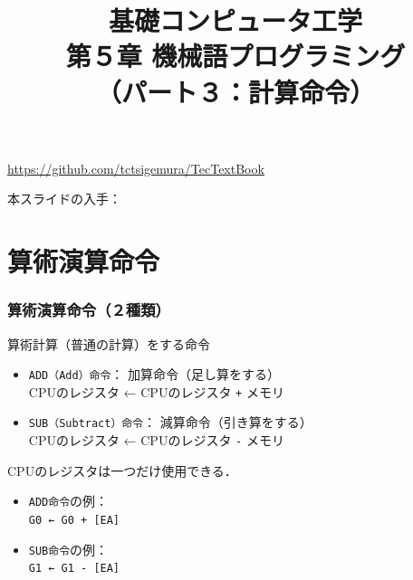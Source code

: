 \documentclass[handout]{beamer}        %
\begin{document}
\title{基礎コンピュータ工学\\第５章 機械語プログラミング\\
       （パート３：計算命令）}
\date{}

\begin{frame}
  \titlepage
  \centerline{\url{https://github.com/tctsigemura/TecTextBook}}
  \vfill
  \centerline{本スライドの入手：
    }
\end{frame}


\section{算術演算命令}
\begin{frame}
  \frametitle{算術演算命令（２種類）}
  算術計算（普通の計算）をする命令
  \begin{itemize}
  \item \texttt{ADD（Add）命令}： 加算命令（足し算をする） \\
    CPUのレジスタ ← CPUのレジスタ \texttt{+} メモリ
  \item \texttt{SUB（Subtract）命令}： 減算命令（引き算をする） \\
    CPUのレジスタ ← CPUのレジスタ \texttt{-} メモリ
  \end{itemize}
  \vfill
  CPUのレジスタは一つだけ使用できる．\\
  \begin{itemize}
  \item \texttt{ADD命令}の例：\\
    \texttt{G0 ← G0 + [EA]}
  \item \texttt{SUB命令}の例：\\
    \texttt{G1 ← G1 - [EA]}
  \end{itemize}
\end{frame}
\end{document}
